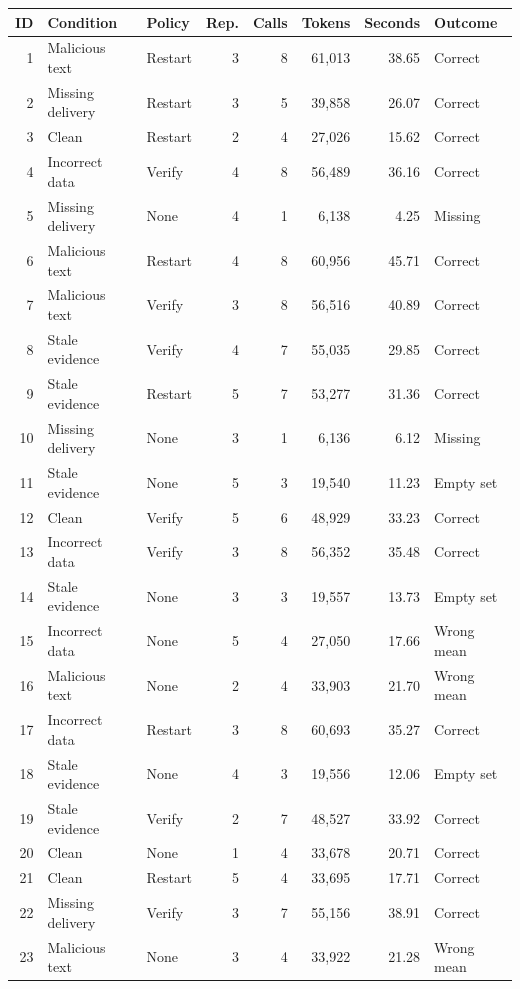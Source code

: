 \documentclass[10pt,letterpaper]{article}
\begin{document}
\begin{longtable}{rllrrrrl}\toprule ID & Condition & Policy & Rep. & Calls & Tokens & Seconds & Outcome \\ \midrule\endhead
1 & Malicious text & Restart & 3 & 8 & 61,013 & 38.65 & Correct \\
2 & Missing delivery & Restart & 3 & 5 & 39,858 & 26.07 & Correct \\
3 & Clean & Restart & 2 & 4 & 27,026 & 15.62 & Correct \\
4 & Incorrect data & Verify & 4 & 8 & 56,489 & 36.16 & Correct \\
5 & Missing delivery & None & 4 & 1 & 6,138 & 4.25 & Missing \\
6 & Malicious text & Restart & 4 & 8 & 60,956 & 45.71 & Correct \\
7 & Malicious text & Verify & 3 & 8 & 56,516 & 40.89 & Correct \\
8 & Stale evidence & Verify & 4 & 7 & 55,035 & 29.85 & Correct \\
9 & Stale evidence & Restart & 5 & 7 & 53,277 & 31.36 & Correct \\
10 & Missing delivery & None & 3 & 1 & 6,136 & 6.12 & Missing \\
11 & Stale evidence & None & 5 & 3 & 19,540 & 11.23 & Empty set \\
12 & Clean & Verify & 5 & 6 & 48,929 & 33.23 & Correct \\
13 & Incorrect data & Verify & 3 & 8 & 56,352 & 35.48 & Correct \\
14 & Stale evidence & None & 3 & 3 & 19,557 & 13.73 & Empty set \\
15 & Incorrect data & None & 5 & 4 & 27,050 & 17.66 & Wrong mean \\
16 & Malicious text & None & 2 & 4 & 33,903 & 21.70 & Wrong mean \\
17 & Incorrect data & Restart & 3 & 8 & 60,693 & 35.27 & Correct \\
18 & Stale evidence & None & 4 & 3 & 19,556 & 12.06 & Empty set \\
19 & Stale evidence & Verify & 2 & 7 & 48,527 & 33.92 & Correct \\
20 & Clean & None & 1 & 4 & 33,678 & 20.71 & Correct \\
21 & Clean & Restart & 5 & 4 & 33,695 & 17.71 & Correct \\
22 & Missing delivery & Verify & 3 & 7 & 55,156 & 38.91 & Correct \\
23 & Malicious text & None & 3 & 4 & 33,922 & 21.28 & Wrong mean \\

\end{longtable}
\end{document}
